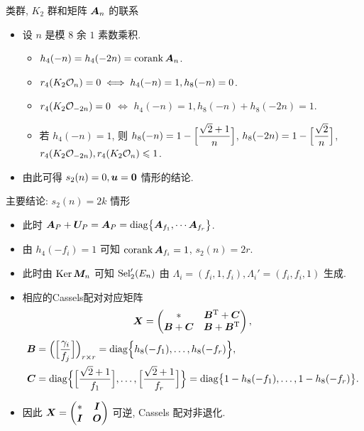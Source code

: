 \documentclass[aspectratio=169]{ctexbeamer}
\renewcommand\aleg[2]{\Bigl[\dfrac{{#1}}{#2}\Bigr]}
\begin{document}
\begin{frame}{类群, $K_2$ 群和矩阵 ${\boldsymbol{A}}_n$ 的联系}
	\begin{itemize}
		\item 设 $n$ 是模 $8$ 余 $1$ 素数乘积.
		\begin{itemize}
			\item $h_4(-n)=h_4(-2n)=\operatorname{corank}{\boldsymbol{A}}_n$.
			\item $r_4(K_2{\mathcal{O}}_n)=0\iff h_4(-n)=1,h_8(-n)=0$.
			\item $r_4(K_2{\mathcal{O}}_{-2n})=0$ $\iff$ $h_4(-n)=1,h_8(-n)+h_8(-2n)=1$.
			\item 若 $h_4(-n)=1$, 则 $h_8(-n)=1-\aleg{\sqrt2+1}{n}$,  $h_8(-2n)=1-\aleg{\sqrt2}{n}$, $r_4(K_2{\mathcal{O}}_{-2n}),r_4(K_2{\mathcal{O}}_n)\leqslant 1$.
		\end{itemize}
		\item 由此可得 $s_2(n)=0,{\boldsymbol{u}}={\bf0}$ 情形的结论.
	\end{itemize}
\end{frame}


\begin{frame}{主要结论: $s_2(n)=2k$ 情形}
	\begin{itemize}
		\item 此时 ${\boldsymbol{A}}_P+{\boldsymbol{U}}_P={\boldsymbol{A}}_P={\mathrm{diag}}\bigl\{
				{\boldsymbol{A}}_{f_1},\cdots {\boldsymbol{A}}_{f_r}
			\bigr\}$.
		\item 由 $h_4(-f_i)=1$ 可知 $\operatorname{corank} {\boldsymbol{A}}_{f_i}=1$, $s_2(n)=2r$.
		\item 此时由 $\operatorname{Ker}{\boldsymbol{M}}_n$ 可知 ${\mathrm{Sel}}_2'(E_n)$ 由 $\Lambda_i=(f_i,1,f_i),\Lambda_i'=(f_i,f_i,1)$ 生成.
		\item 相应的Cassels配对对应矩阵
		\[
			{\boldsymbol{X}}=\begin{pmatrix}
				*&{\boldsymbol{B}}^{\mathrm{T}}+{\boldsymbol{C}}\\{\boldsymbol{B}}+{\boldsymbol{C}}&{\boldsymbol{B}}+{\boldsymbol{B}}^{\mathrm{T}}
			\end{pmatrix},
		\]
		\begin{align*}
			\bfB&
			=\Bigl(\aleg{\gamma_i}{f_j}\Bigr)_{r\times r}
			=\diag\Bigl\{h_8(-f_1),\dots,h_8(-f_r)\Bigr\},\\
			\bfC&
			=\diag\Bigl\{\aleg{\sqrt2+1}{f_1},\dots,\aleg{\sqrt2+1}{f_r}\Bigr\}
			=\diag\bigl\{1-h_8(-f_1),\dots,1-h_8(-f_r)\bigr\}.
		\end{align*}
		\item 因此 ${\boldsymbol{X}}=\begin{pmatrix}
			*&{\boldsymbol{I}}\\{\boldsymbol{I}}&{\boldsymbol{O}}
		\end{pmatrix}$ 可逆, Cassels 配对非退化.
	\end{itemize}
\end{frame}
\end{document}
